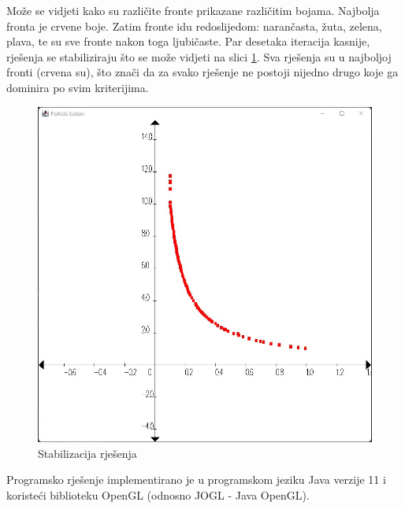 \documentclass[]{article}
\begin{document}
Može se vidjeti kako su različite fronte prikazane različitim bojama. Najbolja fronta je crvene boje. Zatim fronte idu redoslijedom: narančasta, žuta, zelena, plava, te su sve fronte nakon toga ljubičaste. Par desetaka iteracija kasnije, rješenja se stabiliziraju što se može vidjeti na slici \ref{fig:after}. Sva rješenja su u najboljoj fronti (crvena su), što znači da za svako rješenje ne postoji nijedno drugo koje ga dominira po svim kriterijima.\\
\begin{figure}[h]
	\includegraphics[scale=0.6]{after.jpg}
	\centering
	\caption{Stabilizacija rješenja}
	\label{fig:after}
\end{figure}

Programsko rješenje implementirano je u programskom jeziku Java verzije 11 i koristeći biblioteku OpenGL (odnosno JOGL - Java OpenGL).
\end{document}
